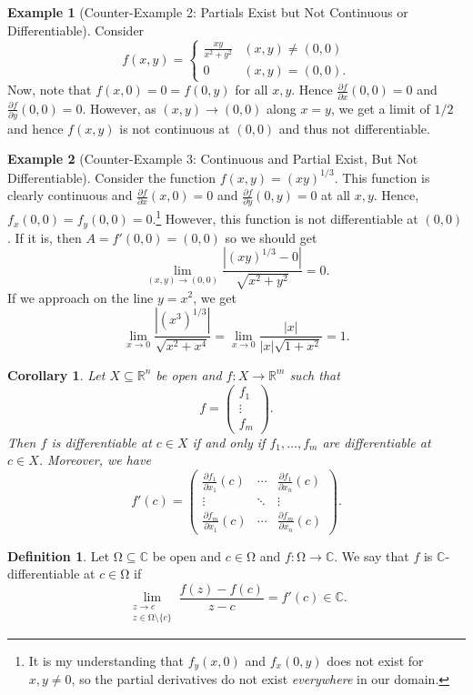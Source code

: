 \documentclass[letterpaper,12pt]{article}
\theoremstyle{definition}
\newtheorem{definition}{Definition}[section]
\newtheorem{example}{Example}[section]
\theoremstyle{plain}
\newtheorem{corollary}[thm]{Corollary}
\theoremstyle{remark}
\newcommand{\C}{\mathbb{C}}
\let\oldOmega\Omega
\renewcommand{\Omega}{\mathrm{\oldOmega}}
\begin{document}
\begin{example}[Counter-Example 2: Partials Exist but Not Continuous or Differentiable] \hfill

Consider
\[f(x,y) = \begin{cases}
\frac{xy}{x^2+y^2} & (x,y)\neq(0,0) \\
0 & (x,y) = (0,0).
\end{cases}\]
Now, note that $f(x,0)=0=f(0,y)$ for all $x,y$. Hence $\frac{\partial f}{\partial x}(0,0) = 0$ and $\frac{\partial f}{\partial y}(0,0) = 0$. However, as $(x,y)\to (0,0)$ along $x=y$, we get a limit of $1/2$ and hence $f(x,y)$ is not continuous at $(0,0)$ and thus not differentiable.
\end{example}

\begin{example}[Counter-Example 3: Continuous and Partial Exist, But Not Differentiable] \hfill

Consider the function $f(x,y) = (xy)^{1/3}$. This function is clearly continuous and $\frac{\partial f}{\partial x}(x,0) = 0$ and $\frac{\partial f}{\partial y}(0,y) = 0$ at all $x,y$. Hence, $f_x(0,0)=f_y(0,0) = 0$.\footnote{It is my understanding that $f_y(x,0)$ and $f_x(0,y)$ does not exist for $x,y\ne 0$, so the partial derivatives do not exist \emph{everywhere} in our domain.} However, this function is not differentiable at $(0,0)$. If it is, then $A=f'(0,0)=(0,0)$ so we should get
\[\lim_{(x,y)\to(0,0)}\frac{|(xy)^{1/3}-0|}{\sqrt{x^2+y^2}} = 0.\]
If we approach on the line $y=x^2$, we get
\[\lim_{x\to 0}\frac{|(x^3)^{1/3}|}{\sqrt{x^2+x^4}} = \lim_{x\to0}\frac{|x|}{|x|\sqrt{1+x^2}} = 1.\]
\end{example}

\begin{corollary}
Let $X\subseteq \mathbb{R}^n$ be open and $f:X\to \mathbb{R}^m$ such that
\[f = \begin{pmatrix}
f_1 \\
\vdots \\
f_m
\end{pmatrix}.\]
Then $f$ is differentiable at $c\in X$ if and only if $f_1,\ldots,f_m$ are differentiable at $c\in X$. Moreover, we have
\[f'(c) = \begin{pmatrix}
\frac{\partial f_1}{\partial x_1}(c) & \cdots & \frac{\partial f_1}{\partial x_n}(c) \\
\vdots & \ddots & \vdots \\
\frac{\partial f_m}{\partial x_1}(c) & \cdots & \frac{\partial f_m}{\partial x_n}(c)
\end{pmatrix}.\]
\end{corollary}
\begin{definition} \label{defn:ComplexDiff}
Let $\Omega\subseteq \mathbb{C}$ be open and $c\in \Omega$ and $f:\Omega\to \mathbb{C}$. We say that $f$ is $\C$-differentiable at $c\in \Omega$ if
\[\lim_{\substack{z\to c \\ z\in\Omega\setminus\{c\}}} \frac{f(z)-f(c)}{z-c} = f'(c) \in \C.\]
\end{definition}
\end{document}
